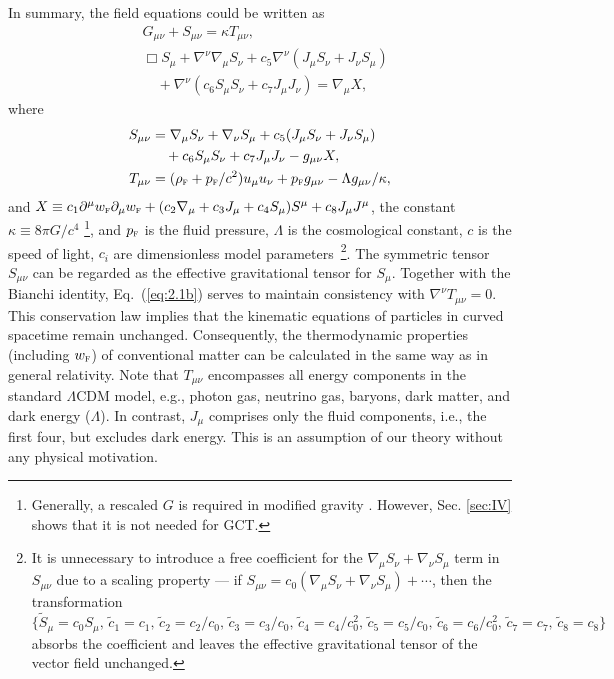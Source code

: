 \documentclass[aps,prd,twocolumn]{revtex4-2}
\newcommand\p{\partial}
\newcommand\subF{\textsc{f}}
\begin{document}
In summary, the field equations could be written as
\begin{subequations}\label{eq:2.1}
\begin{align}
  & G_{\mu\nu} + S_{\mu\nu} = \kappa T_{\mu\nu}, \label{eq:2.1a}\\
  & \Box S_\mu + \nabla^\nu\nabla_\mu S_\nu + c_5\nabla^\nu(J_\mu S_\nu + J_\nu S_\mu) \nonumber\\ 
  & \quad + \nabla^\nu(c_6 S_\mu S_\nu + c_7 J_\mu J_\nu) = \nabla_\mu X, \label{eq:2.1b}
\end{align}
\end{subequations}
where
\begin{subequations}\label{eq:2.2}
\begin{align}
  S_{\mu\nu} &= \nabla_\mu S_\nu + \nabla_\nu S_\mu + c_5(J_\mu S_\nu+J_\nu S_\mu) \nonumber\\
             &  \quad + c_6 S_\mu S_\nu + c_7 J_\mu J_\nu - g_{\mu\nu}X, \\
  T_{\mu\nu} &= (\rho_\subF+p_\subF/c^2)u_\mu u_\nu +p_\subF g_{\mu\nu} - \Lambda g_{\mu\nu}/\kappa, \label{eq:2.2b}
\end{align}
\end{subequations}
and $X \equiv c_1\p^\mu w_\subF\p_\mu w_\subF + (c_2 \nabla_\mu + c_3 J_\mu + c_4 S_\mu) S^\mu + c_8 J_\mu J^\mu$, the constant $\kappa\equiv8\pi G/c^4$ \footnote{Generally, a rescaled $G$ is required in modified gravity \cite{Tian2019.PRD.99.064044}. However, Sec. \ref{sec:IV} shows that it is not needed for GCT.}, and $p_\subF$ is the fluid pressure, $\Lambda$ is the cosmological constant, $c$ is the speed of light, $c_i$ are dimensionless model parameters~\footnote{It is unnecessary to introduce a free coefficient for the $\nabla_\mu S_\nu + \nabla_\nu S_\mu$ term in $S_{\mu\nu}$ due to a scaling property --- if $S_{\mu\nu}=c_0(\nabla_\mu S_\nu + \nabla_\nu S_\mu)+\cdots$, then the transformation $\{\tilde{S}_\mu=c_0S_\mu,\, \tilde{c}_1=c_1,\, \tilde{c}_2=c_2/c_0,\, \tilde{c}_3=c_3/c_0,\, \tilde{c}_4=c_4/c_0^2,\, \tilde{c}_5=c_5/c_0,\, \tilde{c}_6=c_6/c_0^2,\, \tilde{c}_7=c_7,\, \tilde{c}_8=c_8\}$ absorbs the coefficient and leaves the effective gravitational tensor of the vector field unchanged.}. The symmetric tensor $S_{\mu\nu}$ can be regarded as the effective gravitational tensor for $S_\mu$. Together with the Bianchi identity, Eq.~(\ref{eq:2.1b}) serves to maintain consistency with $\nabla^\nu T_{\mu\nu}=0$. This conservation law implies that the kinematic equations of particles in curved spacetime remain unchanged. Consequently, the thermodynamic properties (including $w_\subF$) of conventional matter can be calculated in the same way as in general relativity. Note that $T_{\mu\nu}$ encompasses all energy components in the standard $\Lambda$CDM model, e.g., photon gas, neutrino gas, baryons, dark matter, and dark energy ($\Lambda$). In contrast, $J_\mu$ comprises only the fluid components, i.e., the first four, but excludes dark energy. This is an assumption of our theory without any physical motivation.
\end{document}
